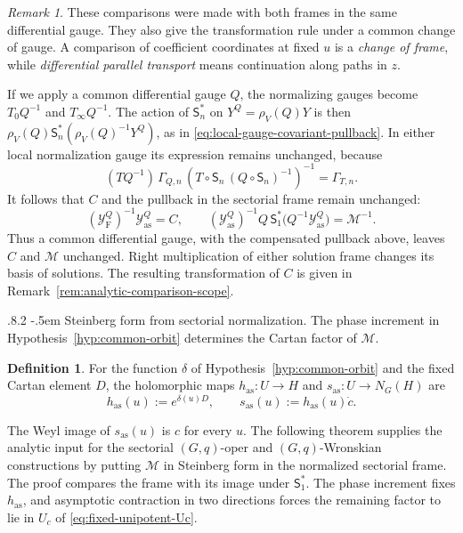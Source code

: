 \documentclass[11pt,leqno]{amsart}
\makeatletter
\numberwithin{equation}{section}
\renewcommand\paragraph{\@startsection{paragraph}{4}{\z@}%
  {.8\baselineskip \@plus .2\baselineskip}%
  {-.5em}%
  {\normalfont\normalsize\bfseries}}
\theoremstyle{plain}
\theoremstyle{definition}
\newtheorem{definition}[theorem]{Definition}
\theoremstyle{plain}
\theoremstyle{definition}
\theoremstyle{remark}
\newtheorem{remark}[theorem]{Remark}
\makeatother
\begin{document}
\begin{remark}\label{rem:general-hypotheses-scope}
These comparisons were made with both frames in the same differential gauge.  They also give the transformation rule under a common change of gauge.  A comparison of coefficient coordinates at fixed $u$ is a \emph{change of frame}, while \emph{differential parallel transport} means continuation along paths in $z$.

If we apply a common differential gauge $Q$, the normalizing gauges become $T_0Q^{-1}$ and $T_\infty Q^{-1}$.  The action of $\mathsf S_n^*$ on $Y^Q=\rho_V(Q)Y$ is then $\rho_V(Q)\mathsf S_n^*(\rho_V(Q)^{-1}Y^Q)$, as in \eqref{eq:local-gauge-covariant-pullback}.  In either local normalization gauge its expression remains unchanged, because
\[
 (TQ^{-1})\,\Gamma_{Q,n}\,
     (T\circ \mathsf S_n\,(Q\circ \mathsf S_n)^{-1})^{-1}=\Gamma_{T,n}.
\]
It follows that $C$ and the pullback in the sectorial frame remain unchanged:
\[
 (\mathcal Y_{\mathrm F}^Q)^{-1}\mathcal Y_{\mathrm{as}}^Q=C,
 \qquad
 (\mathcal Y_{\mathrm{as}}^Q)^{-1}
       Q\,\mathsf S_1^*\bigl(Q^{-1}\mathcal Y_{\mathrm{as}}^Q\bigr)=\mathscr M^{-1}.
\]
Thus a common differential gauge, with the compensated pullback above, leaves $C$ and $\mathscr M$ unchanged.  Right multiplication of either solution frame changes its basis of solutions.  The resulting transformation of $C$ is given in Remark~\ref{rem:analytic-comparison-scope}.
\end{remark}

\paragraph{Steinberg form from sectorial normalization.}
The phase increment in Hypothesis~\ref{hyp:common-orbit} determines the Cartan factor of $\mathscr M$.
\begin{definition}\label{def:asymptotic-Coxeter-factors}
For the function $\delta$ of Hypothesis~\ref{hyp:common-orbit} and the fixed Cartan element $D$, the holomorphic maps $h_{\mathrm{as}}:U\to H$ and $s_{\mathrm{as}}:U\to N_G(H)$ are
\begin{equation}\label{eq:asymptotic-Coxeter-factors}
 h_{\mathrm{as}}(u):=e^{\delta(u)D},\qquad
 s_{\mathrm{as}}(u):=h_{\mathrm{as}}(u)\dot c.
\end{equation}
\end{definition}
The Weyl image of $s_{\mathrm{as}}(u)$ is $c$ for every $u$.  The following theorem supplies the analytic input for the sectorial $(G,q)$-oper and $(G,q)$-Wronskian constructions by putting $\mathscr M$ in Steinberg form in the normalized sectorial frame.  The proof compares the frame with its image under $\mathsf S_1^*$.  The phase increment fixes $h_{\mathrm{as}}$, and asymptotic contraction in two directions forces the remaining factor to lie in $U_c$ of \eqref{eq:fixed-unipotent-Uc}.
\end{document}
